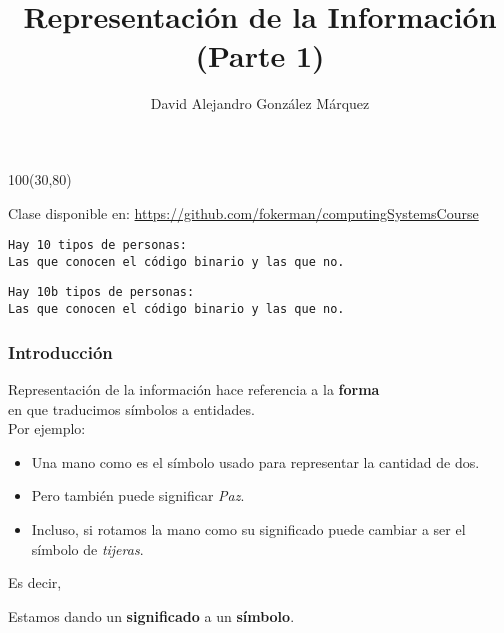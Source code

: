 \documentclass[aspectratio=169]{beamer}
\title{\Huge Representación de la Información\\ \Large (Parte 1)}
\author{David Alejandro González Márquez}
\date{}
\begin{document}
\begin{frame}[plain]
    \titlepage
    \begin{textblock}{100}(30,80)
    \begin{tcolorbox}[size=small,width=\textwidth,colback={gray!30},title={}]
    \begin{center}
     \scriptsize Clase disponible en: \url{https://github.com/fokerman/computingSystemsCourse}
    \end{center}
    \end{tcolorbox}
    \end{textblock}
\end{frame}

\begin{frame}[plain]
    \texttt{Hay 10 tipos de personas:}\\
    \vspace{10px}
    \hspace{1cm}\texttt{Las que conocen el código binario y las que no.}
\end{frame}

\begin{frame}[plain]
    \texttt{Hay 10b tipos de personas:}\\
    \vspace{10px}
    \hspace{1cm}\texttt{Las que conocen el código binario y las que no.}
\end{frame}

\begin{frame}[fragile]
    \frametitle{Introducción}
    Representación de la información hace referencia a la \textbf{forma}\\ en que traducimos símbolos a entidades.\\
    \vspace{5px}
    Por ejemplo: %
    \begin{itemize}
     \item Una mano como \faHandPeaceO \xspace es el símbolo usado para representar la cantidad de dos.
     \item Pero también puede significar \emph{Paz}.
     \item Incluso, si rotamos la mano como \faHandScissorsO \xspace su significado puede cambiar a ser el símbolo de \emph{tijeras}.
    \end{itemize}
    \vspace{12px}
    Es decir,
    \vspace{-12px}
    \begin{block}{\vspace*{-3ex}}
    Estamos dando un \textbf{significado} a un \textbf{símbolo}.
    \end{block}
\end{frame}
\end{document}
